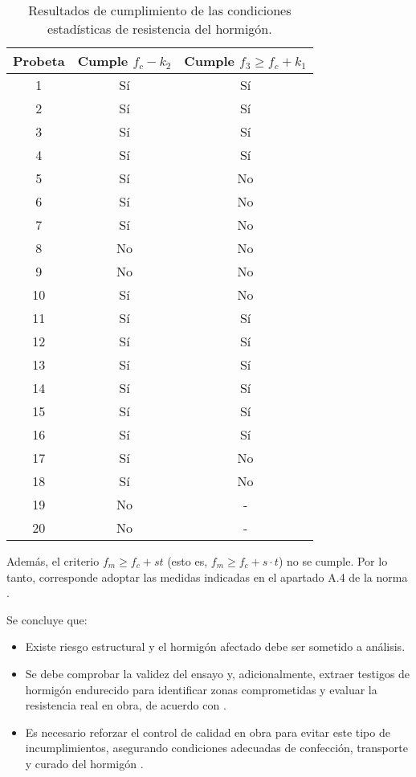 \begin{table}[H]
\centering
\begin{tabular}{|c|c|c|}
\hline
\textbf{Probeta} & \textbf{Cumple $f_c - k_2$} & \textbf{Cumple $f_3 \geq f_c + k_1$} \\ \hline
1  & Sí & Sí \\ \hline
2  & Sí & Sí \\ \hline
3  & Sí & Sí \\ \hline
4  & Sí & Sí \\ \hline
5  & Sí & No \\ \hline
6  & Sí & No \\ \hline
7  & Sí & No \\ \hline
8  & No & No \\ \hline
9  & No & No \\ \hline
10 & Sí & No \\ \hline
11 & Sí & Sí \\ \hline
12 & Sí & Sí \\ \hline
13 & Sí & Sí \\ \hline
14 & Sí & Sí \\ \hline
15 & Sí & Sí \\ \hline
16 & Sí & Sí \\ \hline
17 & Sí & No \\ \hline
18 & Sí & No \\ \hline
19 & No & -  \\ \hline
20 & No & -  \\ \hline
\end{tabular}
\caption{Resultados de cumplimiento de las condiciones estadísticas de resistencia del hormigón.}
\label{tab:cumplimiento}
\end{table}

Además, el criterio $f_m \geq f_c + s t$ (esto es, $f_m \geq f_c + s \cdot t$) no se cumple. Por lo tanto, corresponde adoptar las medidas indicadas en el apartado A.4 de la norma \cite{NCh1998}.

Se concluye que:

\begin{itemize}
    \item Existe riesgo estructural y el hormigón afectado debe ser sometido a análisis.
    \item Se debe comprobar la validez del ensayo y, adicionalmente, extraer testigos de hormigón endurecido para identificar zonas comprometidas y evaluar la resistencia real en obra, de acuerdo con \citep{NCh1171-1-2001,NCh1171-2-2001}.
    \item Es necesario reforzar el control de calidad en obra para evitar este tipo de incumplimientos, asegurando condiciones adecuadas de confección, transporte y curado del hormigón \citep{NCh170-2016}.
\end{itemize}

